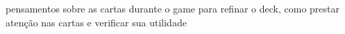 pensamentos sobre as cartas durante o game para refinar o deck, como prestar atenção nas cartas e verificar sua utilidade